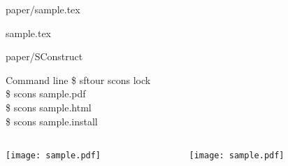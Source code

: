 \begin{frame}
  \begin{block}{paper/sample.tex}
  
                   {sample.tex}
  \end{block}
\end{frame}

\begin{frame}
  \begin{block}{paper/SConstruct}
  
  
  \end{block}
  \begin{block}{Command line}
    \$ sftour scons lock \\
    \$ scons sample.pdf \\
    \$ scons sample.html \\
    \$ scons sample.install
  \end{block}
\end{frame}

\begin{frame}
  \begin{columns}
    \begin{column}{5.5cm}
      \begin{block}{}
      \texttt{[image: sample.pdf]}
      \end{block}
    \end{column}
    \begin{column}{5.5cm}
      \begin{block}{}
      \texttt{[image: sample.pdf]}
      \end{block}
    \end{column}
  \end{columns}
\end{frame}


